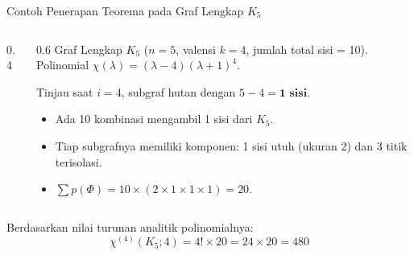 ﻿\documentclass[aspectratio=169]{beamer}
\begin{document}
\begin{frame}[fragile]{Contoh Penerapan Teorema pada Graf Lengkap $K_5$}
  \begin{columns}[T]
    \begin{column}{0.4\textwidth}
      \begin{center}
        \vspace{0.2cm}
      \end{center}
    \end{column}
    \begin{column}{0.6\textwidth}
      Graf Lengkap $K_5$ ($n=5$, valensi $k=4$, jumlah total sisi = 10).\\
      Polinomial $\chi(\lambda) = (\lambda-4)(\lambda+1)^4$.

      \vspace{0.3cm}
      Tinjau saat $i=4$, subgraf hutan dengan $5-4 = \textbf{1 sisi}$.
      \begin{itemize}
        \item Ada 10 kombinasi mengambil 1 sisi dari $K_5$.
        \item Tiap subgrafnya memiliki komponen: 1 sisi utuh (ukuran 2) dan 3 titik terisolasi.
        \item $\sum p(\Phi) = 10 \times (2 \times 1 \times 1 \times 1) = 20$.
      \end{itemize}
    \end{column}
  \end{columns}

  \vspace{0.3cm}
  Berdasarkan nilai turunan analitik polinomialnya:
  $$ \chi^{(4)}(K_5; 4) = 4! \times 20 = 24 \times 20 = 480$$
\end{frame}
\end{document}
